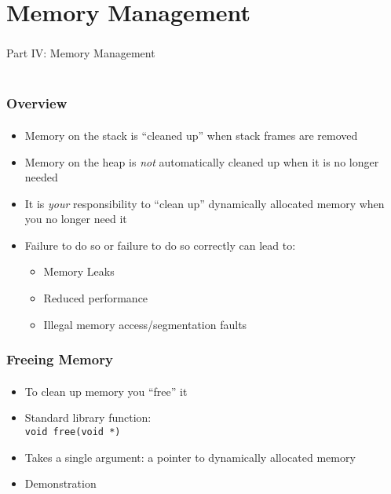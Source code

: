 \documentclass[]{beamer}
\begin{document}
\section{Memory Management}

\begin{frame}
    \frametitle{}
    \framesubtitle{}
    
    \begin{center}
    {\Huge Part IV: Memory Management}\\
    {\Large ~}
    \end{center}

\end{frame}

\begin{frame}[fragile]
    \frametitle{Overview}
    \framesubtitle{}

\begin{itemize}[<+->]  
  \item Memory on the stack is ``cleaned up'' when stack frames are removed
  \item Memory on the heap is \emph{not} automatically cleaned up when it is no longer needed
  \item It is \emph{your} responsibility to ``clean up'' dynamically allocated memory when you no longer need it
  \item Failure to do so or failure to do so correctly can lead to:
  \begin{itemize}
    \item Memory Leaks
    \item Reduced performance
    \item Illegal memory access/segmentation faults
  \end{itemize}
\end{itemize}

\end{frame}

\begin{frame}[fragile]
    \frametitle{Freeing Memory}
    \framesubtitle{}

\begin{itemize}[<+->]  
  \item To clean up memory you ``free'' it
  \item Standard library function: \\
    \texttt{void free(void *)}
  \item Takes a single argument: a pointer to dynamically allocated memory
  \item Demonstration
\end{itemize}

\end{frame}
\end{document}
